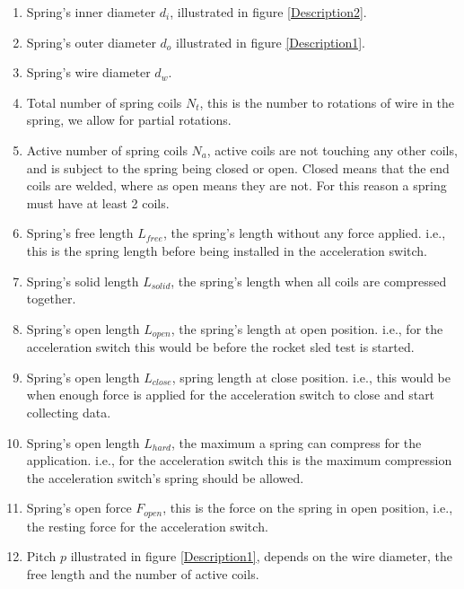 \documentclass[10pt]{article}
\begin{document}
		\begin{enumerate}
			\item Spring's inner diameter $d_{i}$, illustrated in figure \ref{Description2}.
			
			\item Spring's outer diameter $d_{o}$ illustrated in figure \ref{Description1}.
			
			\item Spring's wire diameter $d_{w}$.
			
			\item Total number of spring coils $N_{t}$, this is the number to rotations of wire in the spring, we allow for partial rotations.
			
			\item Active number of spring coils $N_{a}$, active coils are not touching any other coils, and is subject to the spring being closed or open. Closed means that the end coils are welded, where as open means they are not. For this reason a spring must have at least 2 coils.

			\item Spring's free length $L_{free}$, the spring's length without any force applied. i.e., this is the spring length before being installed in the acceleration switch.
			
			\item Spring's solid length $L_{solid}$, the spring's length when all coils are compressed together.
			\item Spring's open length $L_{open}$, the spring's length at open position. i.e., for the acceleration switch this would be before the rocket sled test is started. 
			
			\item Spring's open length $L_{close}$, spring length at close position. i.e., this would be when enough force is applied for the acceleration switch to close and start collecting data.
			
			\item Spring's open length $L_{hard}$, the maximum a spring can compress for the application. i.e., for the acceleration switch this is the maximum compression the acceleration switch's spring should be allowed. 
			
			\item Spring's open force $F_{open}$, this is the force on the spring in open position, i.e., the resting force for the acceleration switch.			
			
			\item Pitch $p$ illustrated in figure \ref{Description1}, depends on the wire diameter, the free length and the number of active coils.
			

\end{enumerate}
\end{document}
